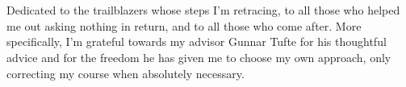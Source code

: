 \vspace*{7cm}
\section*{\Acknowledgements}
\begin{center}

  Dedicated to the trailblazers whose steps I'm retracing, to all those who
helped me out asking nothing in return, and to all those who come after. More
specifically, I'm grateful towards my advisor Gunnar Tufte for his thoughtful
advice and for the freedom he has given me to choose my own approach, only
correcting my course when absolutely necessary.
  
\end{center}

\cleardoublepage

